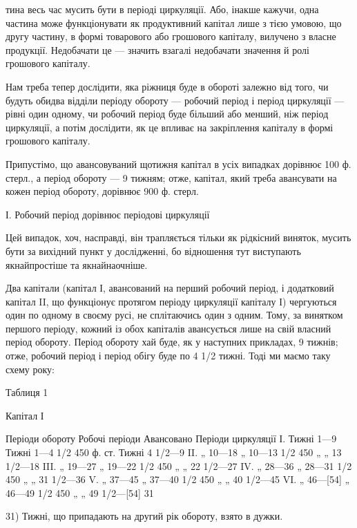 тина весь час мусить бути в періоді циркуляції. Або, інакше кажучи, одна
частина може функціонувати як продуктивний капітал лише з тією умовою,
що другу частину, в формі товарового або грошового капіталу, вилучено
з власне продукції. Недобачати це — значить взагалі недобачати значення
й ролі грошового капіталу.

Нам треба тепер дослідити, яка ріжниця буде в обороті залежно від
того, чи будуть обидва відділи періоду обороту — робочий період і період
циркуляції — рівні один одному, чи робочий період буде більший
або менший, ніж період циркуляції, а потім дослідити, як це впливає на
закріплення капіталу в формі грошового капіталу.

Припустімо, що авансовуваний щотижня капітал в усіх випадках дорівнює
100 ф. стерл., а період обороту — 9 тижням; отже, капітал, який
треба авансувати на кожен період обороту, дорівнює 900 ф. стерл.

І. Робочий період дорівнює періодові циркуляції

Цей випадок, хоч, насправді, він трапляється тільки як рідкісний виняток,
мусить бути за вихідний пункт у дослідженні, бо відношення тут виступають
якнайпростіше та якнайнаочніше.

Два капітали (капітал І, авансований на перший робочий період, і додатковий
капітал II, що функціонує протягом періоду циркуляції капіталу І)
чергуються один по одному в своєму русі, не сплітаючись один з одним.
Тому, за винятком першого періоду, кожний із обох капіталів авансується
лише на свій власний період обороту. Період обороту хай буде,
як у наступних прикладах, 9 тижнів; отже, робочий період і період обігу
буде по 4 1/2 тижні. Тоді ми маємо таку схему року:

Таблиця 1

Капітал І

Періоди обороту    Робочі періоди    Авансовано    Періоди циркуляції
І. Тижні 1—9    Тижні 1—4 1/2                 450 ф. ст.        Тижні 4 1/2—9
II.    „   10—18        „      10—13 1/2             450 „ „                  13 1/2—18
III.   „   19—27       „       19—22 1/2             450 „ „                22 1/2—27
IV.   „    28—36      „        28—31 1/2             450 „ „               31 1/2—36
V.     „    37—45      „        37—40 1/2             450 „ „               40 1/2—45
VI.   „    46—[54]  „        46—49 1/2            450 „ „            49 1/2—[54] 31

31) Тижні, що припадають на другий рік обороту, взято в дужки.
